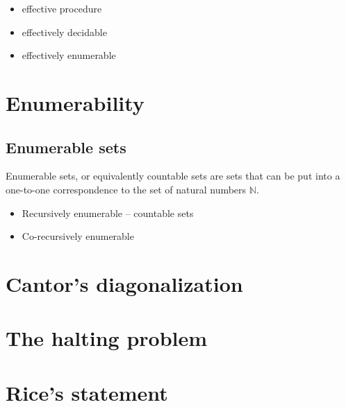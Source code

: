 \begin{itemize}

\item effective procedure

\item effectively decidable

\item effectively enumerable

\end{itemize}


\section{Enumerability}

\subsection{Enumerable sets}

Enumerable sets, or equivalently countable sets are sets that can be put into a
one-to-one correspondence to the set of natural numbers $\mathbb{N}$.


\begin{itemize}

\item Recursively enumerable -- countable sets

\item Co-recursively enumerable

\end{itemize}


\section{Cantor's diagonalization}

\section{The halting problem}

\section{Rice's statement}
